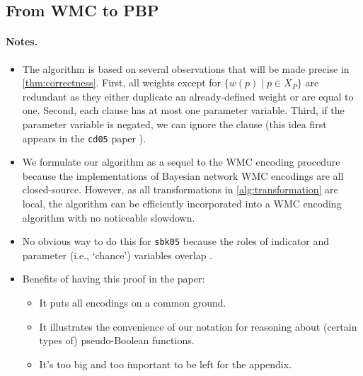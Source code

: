 \documentclass[runningheads]{llncs}
\begin{document}
\subsection{From WMC to PBP}

\paragraph{Notes.}
\begin{itemize}
\item The algorithm is based on several observations that will be made precise
  in \cref{thm:correctness}. First, all weights except for $\{w(p) \mid p \in
  X_P\}$ are redundant as they either duplicate an already-defined weight or are
  equal to one. Second, each clause has at most one parameter variable. Third,
  if the parameter variable is negated, we can ignore the clause (this idea
  first appears in the \texttt{cd05} paper \cite{DBLP:conf/ijcai/ChaviraD05}).
\item We formulate our algorithm as a sequel to the WMC encoding procedure
  because the implementations of Bayesian network WMC encodings are all
  closed-source. However, as all transformations in \cref{alg:transformation}
  are local, the algorithm can be efficiently incorporated into a WMC encoding
  algorithm with no noticeable slowdown.
\item No obvious way to do this for \texttt{sbk05} because the roles of
  indicator and parameter (i.e., `chance') variables overlap
  \cite{DBLP:conf/aaai/SangBK05}.
\item Benefits of having this proof in the paper:
  \begin{itemize}
  \item It puts all encodings on a common ground.
  \item It illustrates the convenience of our notation for reasoning about
    (certain types of) pseudo-Boolean functions.
  \item It's too big and too important to be left for the appendix.
  \end{itemize}
\end{itemize}

\end{document}
